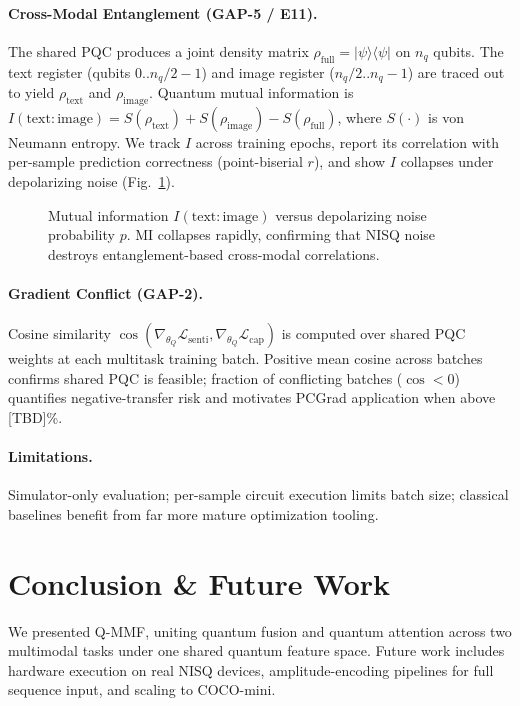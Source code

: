 \documentclass[11pt]{article}
\begin{document}
\paragraph{Cross-Modal Entanglement (GAP-5 / E11).}
The shared PQC produces a joint density matrix
$\rho_{\text{full}} = |\psi\rangle\langle\psi|$ on $n_q$ qubits.
The text register (qubits $0..n_q/2{-}1$) and image register
($n_q/2..n_q{-}1$) are traced out to yield
$\rho_{\text{text}}$ and $\rho_{\text{image}}$.
Quantum mutual information is
$I(\text{text}:\text{image}) = S(\rho_{\text{text}}) + S(\rho_{\text{image}})
- S(\rho_{\text{full}})$, where $S(\cdot)$ is von Neumann entropy.
We track $I$ across training epochs, report its correlation with per-sample
prediction correctness (point-biserial $r$), and show $I$ collapses under
depolarizing noise (Fig.~\ref{fig:mi_noise}).

\begin{figure}[t]
  \centering
  \caption{Mutual information $I(\text{text}:\text{image})$ versus
           depolarizing noise probability $p$. MI collapses rapidly,
           confirming that NISQ noise destroys entanglement-based
           cross-modal correlations.}
  \label{fig:mi_noise}
\end{figure}

\paragraph{Gradient Conflict (GAP-2).}
Cosine similarity $\cos(\nabla_{\theta_Q}\mathcal{L}_{\text{senti}},
\nabla_{\theta_Q}\mathcal{L}_{\text{cap}})$ is computed over shared PQC
weights at each multitask training batch. Positive mean cosine across
batches confirms shared PQC is feasible; fraction of conflicting batches
($\cos < 0$) quantifies negative-transfer risk and motivates PCGrad
application when above [TBD]\%.

\paragraph{Limitations.}
Simulator-only evaluation; per-sample circuit execution limits batch size;
classical baselines benefit from far more mature optimization tooling.

\section{Conclusion \& Future Work}
We presented Q-MMF, uniting quantum fusion and quantum attention across two
multimodal tasks under one shared quantum feature space. Future work includes
hardware execution on real NISQ devices, amplitude-encoding pipelines for full
sequence input, and scaling to COCO-mini.



\end{document}
